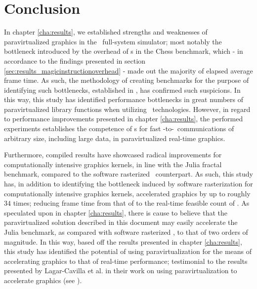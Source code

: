 
\chapter{Conclusion}
\label{cha:conclusion}
In chapter \ref{cha:results}, we established strengths and weaknesses of paravirtualized graphics in the \dvttermsimics\ full-system simulator; most notably the bottleneck introduced by the overhead of \dvttermmagicinstruction s in the Chess benchmark, which - in accordance to the findings presented in section \ref{sec:results_magicinstructionoverhead} - made out the majority of elapsed average frame time.
As such, the methodology of creating benchmarks for the purpose of identifying such bottlenecks, established in , has confirmed such suspicions.
In this way, this study has identified performance bottlenecks in great numbers of paravirtualized library functions when utilizing \dvttermmagicinstruction\ technologies.
However, in regard to performance improvements presented in chapter \ref{cha:results}, the performed experiments establishes the competence of \dvttermmagicinstruction s for fast \dvttermtarget -to-\dvttermhost\ communications of arbitrary size, including large data, in paravirtualized real-time graphics.

Furthermore, compiled results have showcased radical improvements for computationally intensive graphics kernels, in line with the Julia fractal benchmark, compared to the software rasterized \dvttermsimics\ counterpart.
As such, this study has, in addition to identifying the bottleneck induced by software rasterization for computationally intensive graphics kernels, accelerated graphics by up to roughly $34$ times; reducing frame time from that of  to the real-time feasible count of .
As speculated upon in chapter \ref{cha:results}, there is cause to believe that the paravirtualized solution described in this document may easily accelerate the Julia benchmark, as compared with software rasterized \dvttermsimics , to that of two orders of magnitude.
In this way, based off the results presented in chapter \ref{cha:results}, this study has identified the potential of using paravirtualization for the means of accelerating graphics to that of real-time performance; testimonial to the results presented by Lagar-Cavilla et al. in their work on using paravirtualization to accelerate graphics (see ).

